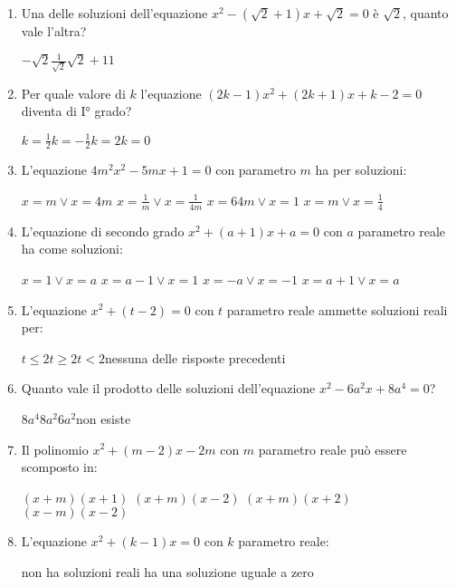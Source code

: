 \begin{esercizio}[\Ast]
\begin{enumerate}
	\item Una delle soluzioni dell'equazione $x^{2}-(\sqrt{2} + 1) x + \sqrt{2} = 0$ è $\sqrt{2}$, quanto vale l'altra?

\boxA\quad $ - \sqrt{2} $\qquad \boxB\quad $\frac{1}{\sqrt{2}}$\qquad\boxC\quad $\sqrt{2} + 1$\qquad\boxD\quad $1$

	\item Per quale valore di $ k $ l'equazione $(2k-1) x^{2} + (2k + 1) x + k-2 = 0$ diventa di I° grado?

\boxA\quad $k = \frac{1}{2}$\qquad \boxB\quad $k =-\frac{1}{2}$\qquad\boxC\quad $k = 2$\qquad\boxD\quad $k = 0$

	\item L'equazione $4m^{2} x^{2}-5mx + 1 = 0$ con parametro $ m $ ha per soluzioni:

\boxA\; $x = m \vee x = 4m$\quad \boxB\; $x = \frac{1}{m} \vee x = \frac{1}{4m}$\quad\boxC\; $x = 64m \vee x = 1$\quad\boxD\; $x = m \vee x = \frac{1}{4}$

	\item L'equazione di secondo grado $x^{2} + (a + 1) x + a = 0$ con $ a $ parametro reale ha come soluzioni:

\boxA\; $x = 1 \vee x = a$\quad \boxB\; $x = a-1 \vee x = 1$\quad\boxC\; $x =-a \vee x =-1$\quad\boxD\; $x = a + 1 \vee x = a$

	\item L'equazione $x^{2} + (t-2) = 0$ con $ t $ parametro reale ammette soluzioni reali per:

\boxA\quad $t \leq 2$\qquad \boxB\quad $t \geq 2$\qquad\boxC\quad $t < 2$\qquad\boxD\quad nessuna delle risposte precedenti

	\item Quanto vale il prodotto delle soluzioni dell'equazione $x^{2}-6a^{2} x + 8a^{4} = 0$?

\boxA\quad $8a^{4}$\qquad \boxB\quad $8a^{2}$\qquad\boxC\quad $6a^{2}$\qquad\boxD\quad non esiste

	\item Il polinomio $x^{2} + (m-2) x-2m$ con $ m $ parametro reale può essere scomposto in:

\boxA\; $(x + m) (x + 1)$\quad\boxB\; $(x + m) (x-2)$\quad\boxC\; $(x + m) (x + 2)$\quad\boxD\; $(x-m) (x-2)$

	\item L'equazione $x^{2} + (k-1) x = 0$ con $ k $ parametro reale:

\boxA\; non ha soluzioni reali\quad\boxB\; ha una soluzione uguale a zero


\end{enumerate}
\end{esercizio}

